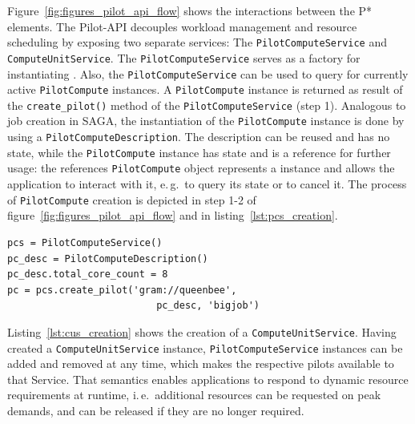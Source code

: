 \documentclass[conference]{IEEEtran}
\begin{document}
Figure~\ref{fig:figures_pilot_api_flow} shows the interactions between the
P* elements.
The Pilot-API decouples workload management and resource scheduling by exposing
two separate services: The \texttt{Pilot\-Compute\-Service} and
\texttt{Compute\-Unit\-Service}. 
The \texttt{Pilot\-Compute\-Service} serves as a factory for instantiating \pilots. 
Also, the \texttt{Pilot\-Compute\-Service} can be used to query for currently
active \texttt{Pilot\-Compute} instan\-ces.
A \texttt{Pilot\-Compute} instance is returned as result of the
\texttt{create\_pilot()} method of the \texttt{Pi\-lot\-Compute\-Service} (step 1).
Analogous to job creation in SAGA, the instantiation of the
\texttt{Pilot\-Compute} instance is done by using a
\texttt{Pilot\-ComputeDescription}. The description can be reused and has no
state, while the \texttt{Pilot\-Compute} instance has state and is a reference
for further usage:
the references \texttt{Pilot\-Compute} object represents a \pilot instance and allows the 
application to interact with it, e.\,g.\ to query its state or to cancel 
it. The process of \texttt{Pilot\-Compute} creation is depicted in step 1-2 of 
figure~\ref{fig:figures_pilot_api_flow} and in listing~\ref{lst:pcs_creation}.


\lstset{
language=Python,
frame=single,
captionpos=b,
stringstyle=\ttfamily,
basicstyle=\scriptsize\ttfamily
}

\begin{minipage}{0.45 \textwidth}
\begin{lstlisting}[caption={\I{Creation of a \T{PilotCompute} instance using a \T{Pi\-lot\-Compute\-Description}.}}, label={lst:pcs_creation}]
pcs = PilotComputeService()
pc_desc = PilotComputeDescription()
pc_desc.total_core_count = 8
pc = pcs.create_pilot('gram://queenbee', 
                          pc_desc, 'bigjob')
\end{lstlisting}
\end{minipage}

Listing~\ref{lst:cus_creation} shows the creation of
a \texttt{Compute\-Unit\-Service}.  Having created
a \texttt{Compute\-Unit\-Service} instance, \texttt{Pilot\-Compute\-Service}
instances can be added and removed at any time, which makes the respective pilots available to that Service.  That semantics enables applications to
respond to dynamic resource requirements at runtime, i.\,e.\ additional
resources can be requested on peak demands, and can be released if they are no
longer required.\\
\end{document}
